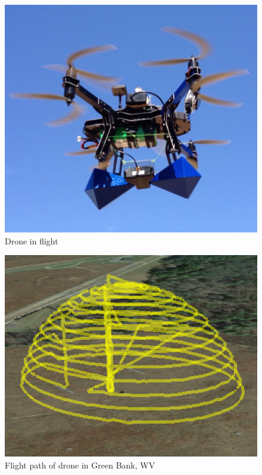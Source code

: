 \documentclass[preprint2]{aastex}
\begin{document}
\onecolumn
\begin{center}

\begin{figure}[h]
\centering
\includegraphics[scale=0.5]{images/drone.png}
\caption{Drone in flight}
\label{fig:Drone}
\end{figure}

\begin{figure}[h]
\centering
\includegraphics[scale=0.7]{images/flight_path.png}
\caption{Flight path of drone in Green Bank, WV}
\label{fig:Flight path}
\end{figure}


\end{center}
\end{document}
